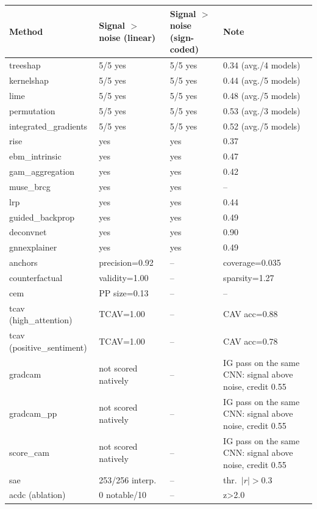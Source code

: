 \begin{tabular}{@{}llll@{}}
\toprule
Method & Signal $>$ noise (linear) & Signal $>$ noise (sign-coded) & Note \\
\midrule
treeshap & 5/5 yes & 5/5 yes & 0.34 (avg./4 models) \\
kernelshap & 5/5 yes & 5/5 yes & 0.44 (avg./5 models) \\
lime & 5/5 yes & 5/5 yes & 0.48 (avg./5 models) \\
permutation & 5/5 yes & 5/5 yes & 0.53 (avg./3 models) \\
integrated\_gradients & 5/5 yes & 5/5 yes & 0.52 (avg./5 models) \\
rise & yes & yes & 0.37 \\
ebm\_intrinsic & yes & yes & 0.47 \\
gam\_aggregation & yes & yes & 0.42 \\
muse\_brcg & yes & yes & -- \\
lrp & yes & yes & 0.44 \\
guided\_backprop & yes & yes & 0.49 \\
deconvnet & yes & yes & 0.90 \\
gnnexplainer & yes & yes & 0.49 \\
anchors & precision=0.92 & -- & coverage=0.035 \\
counterfactual & validity=1.00 & -- & sparsity=1.27 \\
cem & PP size=0.13 & -- & -- \\
tcav (high\_attention) & TCAV=1.00 & -- & CAV acc=0.88 \\
tcav (positive\_sentiment) & TCAV=1.00 & -- & CAV acc=0.78 \\
gradcam & not scored natively & -- & IG pass on the same CNN: signal above noise, credit 0.55 \\
gradcam\_pp & not scored natively & -- & IG pass on the same CNN: signal above noise, credit 0.55 \\
score\_cam & not scored natively & -- & IG pass on the same CNN: signal above noise, credit 0.55 \\
sae & 253/256 interp. & -- & thr.\ $|r|{>}$0.3 \\
acdc (ablation) & 0 notable/10 & -- & z{>}2.0 \\
\bottomrule
\end{tabular}

